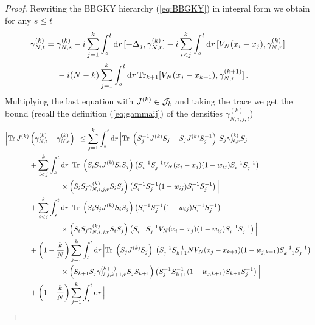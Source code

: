 \documentclass[11pt]{article}
\newcommand{\rd}{{\rm d}}
\newcommand{\tr}{\mbox{Tr}}
\newcommand{\cJ}{{\cal J}}
\begin{document}
\begin{proof}
Rewriting the BBGKY hierarchy
(\ref{eq:BBGKY}) in integral form we obtain for any $s\leq t$
\begin{equation}
\begin{split}
\gamma_{N,t}^{(k)} = \; &\gamma_{N,s}^{(k)} -i \sum_{j=1}^k \int_s^t
\rd r \, [ -\Delta_j , \gamma_{N,r}^{(k)} ] - i
\sum_{i<j}^k \int_s^t  \rd r \, [ V_N (x_i -x_j), \gamma_{N,r}^{(k)} ] \\
& -i (N-k) \sum_{j=1}^k \int_s^t \rd r \, \tr_{k+1} [ V_N (x_j
-x_{k+1}) , \gamma_{N,r}^{(k+1)} ] \,.
\end{split}
\end{equation}
Multiplying the last equation with $J^{(k)} \in \cJ_k$ and taking
the trace we get the bound (recall the definition
(\ref{eq:gammaij}) of the densities $\gamma_{N,i,j,t}^{(k)}$)
\begin{equation}\label{eq:equi-1}
\begin{split}
\Big| \tr \, J^{(k)} &\left(  \gamma_{N,t}^{(k)} -
\gamma_{N,s}^{(k)} \right) \Big| \leq \sum_{j=1}^k \int_s^t \rd r \,
\Big| \tr \; \left( S_j^{-1} J^{(k)} S_j - S_j J^{(k)} S_j^{-1}
\right) \, S_j  \gamma_{N,r}^{(k)} S_j \Big| \\ &+ \sum_{i<j}^k
\int_s^t \rd r \, \Big| \tr \; \left(S_i S_j J^{(k)} S_i S_j \right)
\left( S_i^{-1} S_j^{-1} V_N (x_i -x_j) (1-w_{ij}) S_i^{-1}
S_j^{-1}\right)
\\ &\hspace{1.5cm} \times \left(S_i S_j  \gamma^{(k)}_{N,i,j,r} S_i S_j
\right) \left(S_i^{-1} S_j^{-1} (1-w_{ij}) S_i^{-1} S_j^{-1}\right)\Big| \\
&+ \sum_{i<j}^k \int_s^t \rd r \, \Big| \tr \; \left(S_i S_j J^{(k)}
S_i S_j\right)  \left(S_i^{-1} S_j^{-1} (1-w_{ij}) S_i^{-1}
S_j^{-1}\right)
\\ &\hspace{1.5cm} \times \left(S_i S_j  \gamma^{(k)}_{N,i,j,r} S_i S_j
\right) \left( S_i^{-1} S_j^{-1} V_N (x_i -x_j) (1-w_{ij}) S_i^{-1}
S_j^{-1}\right) \Big|\\
&+\left(1-\frac{k}{N} \right) \sum_{j=1}^k \int_s^t \rd r \, \Big|
\tr \; \left(S_j J^{(k)} S_j \right)\; \left(S_j^{-1} S_{k+1}^{-1} N
V_N
(x_j - x_{k+1}) (1- w_{j,k+1}) S_{k+1}^{-1} S_j^{-1} \right) \\
&\hspace{1.5cm} \times \left( S_{k+1} S_j \gamma^{(k+1)}_{N,j,k+1,r}
S_j S_{k+1}\right) \left(S_j^{-1} S_{k+1}^{-1} (1-w_{j,k+1})
S_{k+1} S_j^{-1}\right)\Big| \\
&+\left(1-\frac{k}{N} \right) \sum_{j=1}^k \int_s^t \rd r \, \Big|

\end{split}
\end{equation}
\end{proof}
\end{document}
